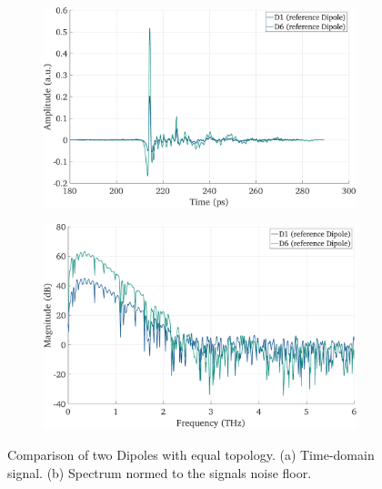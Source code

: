 \begin{figure}[!tbp]
    \centering
    \begin{subfigure}[b]{0.485\textwidth}
        \centering
        \includegraphics[width=\textwidth]{figures/Results/D1_D6/D1_D6_time.pdf}
        \caption{}
    \end{subfigure}
    \hfill
    \begin{subfigure}[b]{0.485\textwidth}
        \centering
        \includegraphics[width=\textwidth]{figures/Results/D1_D6/D1_D6_spectrum_nn.pdf}
        \caption{}
    \end{subfigure}
    \caption{Comparison of two Dipoles with equal topology. (a) Time-domain signal. (b) Spectrum normed to the signals noise floor.}
\end{figure}

